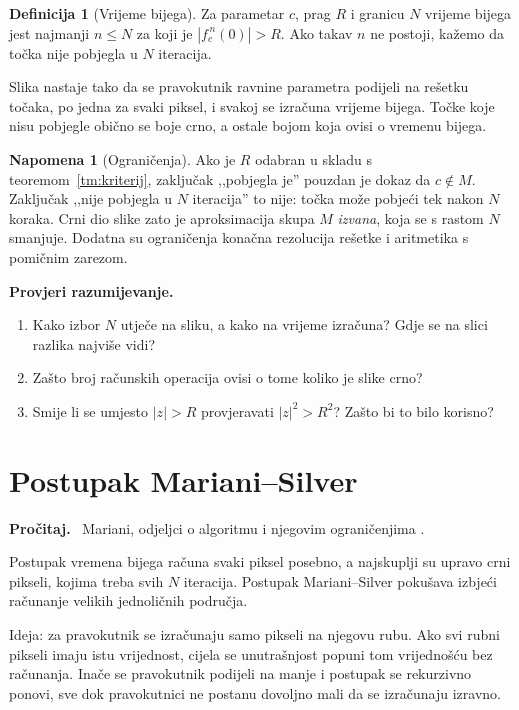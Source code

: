 \documentclass[11pt,a4paper]{article}
\theoremstyle{definition}
\newtheorem{definicija}{Definicija}[section]
\newtheorem*{napomena}{Napomena}
\theoremstyle{plain}
\newenvironment{citaj}
  {\par\medskip\noindent\textbf{\color{blue!60!black}Pročitaj.}\ }
  {\par\medskip}
\newenvironment{pitanja}
  {\par\noindent\textbf{\color{orange!70!black}Provjeri razumijevanje.}
   \begin{enumerate}[label=\arabic*., nosep]}
  {\end{enumerate}\medskip}
\begin{document}
\begin{definicija}[Vrijeme bijega]
Za parametar $c$, prag $R$ i granicu $N$ vrijeme bijega jest najmanji
$n \le N$ za koji je $|f_c^{\,n}(0)| > R$. Ako takav $n$ ne postoji, kažemo
da točka nije pobjegla u $N$ iteracija.
\end{definicija}

Slika nastaje tako da se pravokutnik ravnine parametra podijeli na rešetku
točaka, po jedna za svaki piksel, i svakoj se izračuna vrijeme bijega.
Točke koje nisu pobjegle obično se boje crno, a ostale bojom koja ovisi o
vremenu bijega.

\begin{napomena}[Ograničenja]
Ako je $R$ odabran u skladu s teoremom~\ref{tm:kriterij}, zaključak
,,pobjegla je'' pouzdan je dokaz da $c \notin M$. Zaključak ,,nije pobjegla u
$N$ iteracija'' to nije: točka može pobjeći tek nakon $N$ koraka. Crni dio
slike zato je aproksimacija skupa $M$ \emph{izvana}, koja se s rastom $N$
smanjuje. Dodatna su ograničenja konačna rezolucija rešetke i aritmetika s
pomičnim zarezom.
\end{napomena}

\begin{pitanja}
  \item Kako izbor $N$ utječe na sliku, a kako na vrijeme izračuna? Gdje se
        na slici razlika najviše vidi?
  \item Zašto broj računskih operacija ovisi o tome koliko je slike crno?
  \item Smije li se umjesto $|z| > R$ provjeravati $|z|^2 > R^2$? Zašto bi
        to bilo korisno?
\end{pitanja}

\section{Postupak Mariani--Silver}
\label{sec:mariani}

\begin{citaj}
Mariani, odjeljci o algoritmu i njegovim ograničenjima \cite{mariani2021}.
\end{citaj}

Postupak vremena bijega računa svaki piksel posebno, a najskuplji su upravo
crni pikseli, kojima treba svih $N$ iteracija. Postupak Mariani--Silver
pokušava izbjeći računanje velikih jednoličnih područja.

Ideja: za pravokutnik se izračunaju samo pikseli na njegovu rubu. Ako svi
rubni pikseli imaju istu vrijednost, cijela se unutrašnjost popuni tom
vrijednošću bez računanja. Inače se pravokutnik podijeli na manje i postupak
se rekurzivno ponovi, sve dok pravokutnici ne postanu dovoljno mali da se
izračunaju izravno.
\end{document}
